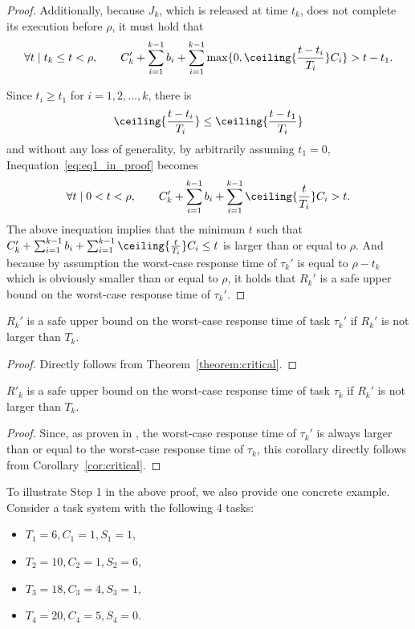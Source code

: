\begin{proof}
Additionally, because $J_k$, which is released at time $t_k$, does not complete its execution before $\rho$, it must hold that
\begin{equation}
\label{eq:eq1_in_proof}
\forall t \mid t_k \leq t < \rho,\qquad  C_k'+\sum_{i=1}^{k-1} b_i + \sum_{i=1}^{k-1} \max\{ 0, \ceiling{\frac{t- t_i}{T_i} } C_i\} > t-t_1.
\end{equation}

Since $t_i \geq t_1$ for $i=1,2,\ldots,k$, there is 
$$\ceiling{\frac{t- t_i}{T_i} } \leq \ceiling{\frac{t- t_1}{T_i} }$$ and without any loss of generality, by arbitrarily assuming $t_1 =0$, Inequation~\ref{eq:eq1_in_proof} becomes
\[
\forall t \mid 0 < t < \rho, \qquad C_k'+\sum_{i=1}^{k-1} b_i + \sum_{i=1}^{k-1} \ceiling{\frac{t}{T_i} } C_i > t.
\]
The above inequation implies that the minimum $t$ such that $C_k'+\sum_{i=1}^{k-1} b_i + \sum_{i=1}^{k-1} \ceiling{\frac{t}{T_i} } C_i \leq t$ is larger than or equal to $\rho$. And because by assumption the worst-case response time of $\tau_k'$ is equal to $\rho-t_k$ which is obviously smaller than or equal to $\rho$, it holds that $R_k'$ is a safe upper bound on the worst-case response time of $\tau_k'$.
\end{proof}

\begin{Corollary}
\label{cor:critical}
 $R_k'$ is a safe upper bound on the worst-case response time of task $\tau_k'$ if $R_k'$ is not larger than $T_k$.
\end{Corollary}
\begin{proof}
Directly follows from Theorem~\ref{theorem:critical}.
\end{proof}



\begin{Corollary}
$R'_k$ is a safe upper bound on the worst-case response time of task $\tau_k$ if $R_k'$ is not larger than $T_k$. 
\end{Corollary}
\begin{proof}
Since, as proven in \cite{Rajkumar_1990,Liu_2014}, the worst-case response time of $\tau_k'$ is always larger than or equal to the worst-case response time of $\tau_k$, this corollary directly follows from Corollary~\ref{cor:critical}. 
\end{proof}


  
To illustrate Step 1 in the above proof, we also provide one concrete example. Consider a task system with the following 4 tasks:
\begin{itemize}
\item $T_1 = 6, C_1 = 1, S_1 = 1$,
\item $T_2 = 10, C_2 = 1, S_2 = 6$,
\item $T_3 = 18, C_3 = 4, S_3 = 1$,
\item $T_4 = 20, C_4 = 5, S_4 = 0$.
\end{itemize}


